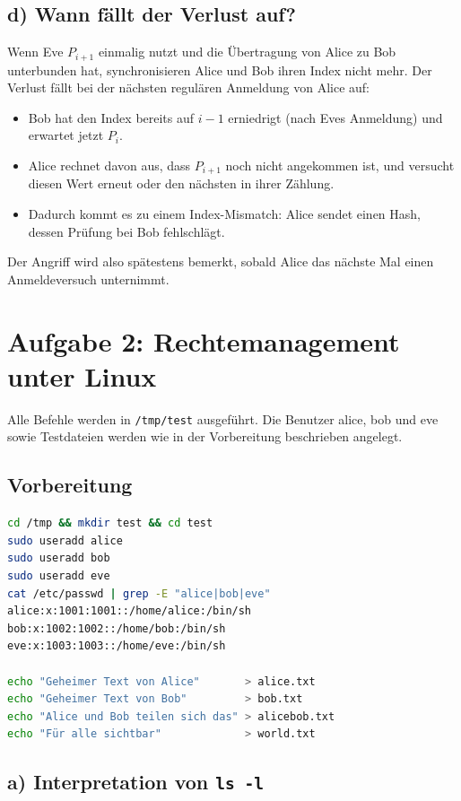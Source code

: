 \documentclass[
	fontsize=12pt,
	paper=a4,
	numbers=noenddot,
	listof=totoc,
	listof=entryprefix,
	listof=nochaptergap,
	bibliography=totoc,
	parskip=half,
	openany
]{scrbook}
\begin{document}
\section*{d) Wann fällt der Verlust auf?}

Wenn Eve $P_{i+1}$ einmalig nutzt und die Übertragung von Alice zu Bob unterbunden hat, synchronisieren Alice und Bob ihren Index nicht mehr.
Der Verlust fällt bei der nächsten regulären Anmeldung von Alice auf:

\begin{itemize}
	\item Bob hat den Index bereits auf $i-1$ erniedrigt (nach Eves Anmeldung) und erwartet jetzt $P_i$.
	\item Alice rechnet davon aus, dass $P_{i+1}$ noch nicht angekommen ist, und versucht diesen Wert erneut oder den nächsten in ihrer Zählung.
	\item Dadurch kommt es zu einem Index-Mismatch: Alice sendet einen Hash, dessen Prüfung bei Bob fehlschlägt.
\end{itemize}

Der Angriff wird also spätestens bemerkt, sobald Alice das nächste Mal einen Anmeldeversuch unternimmt.


\chapter*{Aufgabe 2: Rechtemanagement unter Linux}

Alle Befehle werden in \texttt{/tmp/test} ausgeführt.
Die Benutzer alice, bob und eve sowie Testdateien werden wie in der Vorbereitung beschrieben angelegt.

\section*{Vorbereitung}

\begin{lstlisting}[language=bash]
cd /tmp && mkdir test && cd test
sudo useradd alice
sudo useradd bob
sudo useradd eve
cat /etc/passwd | grep -E "alice|bob|eve"
alice:x:1001:1001::/home/alice:/bin/sh
bob:x:1002:1002::/home/bob:/bin/sh
eve:x:1003:1003::/home/eve:/bin/sh

echo "Geheimer Text von Alice"       > alice.txt
echo "Geheimer Text von Bob"         > bob.txt
echo "Alice und Bob teilen sich das" > alicebob.txt
echo "Für alle sichtbar"             > world.txt
\end{lstlisting}

\section*{a) Interpretation von \texttt{ls -l}}
\end{document}
